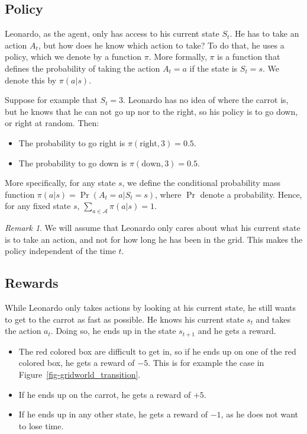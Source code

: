 \documentclass[
  letterpaper,
]{report}
\providecommand{\tightlist}{%
  \setlength{\itemsep}{0pt}\setlength{\parskip}{0pt}}\usepackage{longtable,booktabs,array}
\theoremstyle{plain}
\theoremstyle{definition}
\theoremstyle{definition}
\theoremstyle{remark}
\newtheorem*{remark}{Remark}
\begin{document}
\hypertarget{policy}{%
\subsection{Policy}\label{policy}}

Leonardo, as the agent, only has access to his current state \(S_t\). He
has to take an action \(A_t\), but how does he know which action to
take? To do that, he uses a policy, which we denote by a function
\(\pi\). More formally, \(\pi\) is a function that defines the
probability of taking the action \(A_t = a\) if the state is
\(S_t = s\). We denote this by \(\pi(a|s)\).

Suppose for example that \(S_t = 3\). Leonardo has no idea of where the
carrot is, but he knows that he can not go up nor to the right, so his
policy is to go down, or right at random. Then:

\begin{itemize}
\tightlist
\item
  The probability to go right is \(\pi(\text{right}, 3) = 0.5\).
\item
  The probability to go down is \(\pi(\text{down}, 3) = 0.5\).
\end{itemize}

More specifically, for any state \(s\), we define the conditional
probability mass function \(\pi(a|s) = \Pr(A_t = a | S_t = s)\), where
\(\Pr\) denote a probability. Hence, for any fixed state \(s\),
\(\sum_{a\in\mathcal{A}} \pi(a|s) = 1\).

\begin{remark}

We will assume that Leonardo only cares about what his current state is
to take an action, and not for how long he has been in the grid. This
makes the policy independent of the time \(t\).

\end{remark}

\hypertarget{rewards}{%
\subsection{Rewards}\label{rewards}}

While Leonardo only takes actions by looking at his current state, he
still wants to get to the carrot as fast as possible. He knows his
current state \(s_t\) and takes the action \(a_t\). Doing so, he ends up
in the state \(s_{t+1}\) and he gets a reward.

\begin{itemize}
\tightlist
\item
  The red colored box are difficult to get in, so if he ends up on one
  of the red colored box, he gets a reward of \(-5\). This is for
  example the case in Figure~\ref{fig-gridworld_transition}.
\item
  If he ends up on the carrot, he gets a reward of \(+5\).
\item
  If he ends up in any other state, he gets a reward of \(-1\), as he
  does not want to lose time.
\end{itemize}
\end{document}
